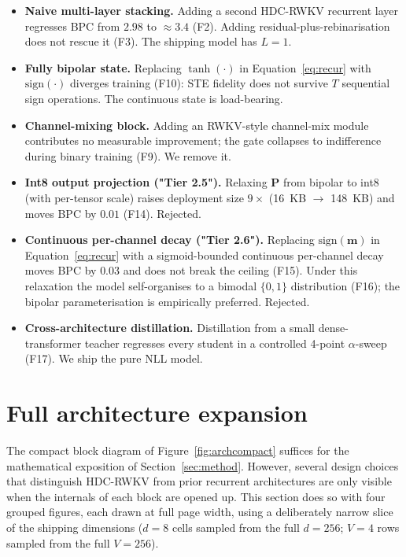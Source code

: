 \documentclass[runningheads]{llncs}
\newcommand{\bP}{\mathbf{P}}
\newcommand{\bm}{\mathbf{m}}
\begin{document}
\begin{itemize}
  \item \textbf{Naive multi-layer stacking.}
        Adding a second HDC-RWKV recurrent layer regresses BPC
        from $2.98$ to ${\approx}3.4$ (F2). Adding
        residual-plus-rebinarisation does not
        rescue it (F3). The shipping model has $L=1$.
  \item \textbf{Fully bipolar state.}
        Replacing $\tanh(\cdot)$ in Equation~\ref{eq:recur} with
        $\mathrm{sign}(\cdot)$ diverges training (F10): STE fidelity
        does not survive $T$ sequential sign operations. The
        continuous state is load-bearing.
  \item \textbf{Channel-mixing block.}
        Adding an RWKV-style channel-mix module contributes no
        measurable improvement; the gate collapses to indifference
        during binary training (F9). We remove it.
  \item \textbf{Int8 output projection ("Tier 2.5").}
        Relaxing $\bP$ from bipolar to int8 (with per-tensor scale)
        raises deployment size $9\times$ (16~KB $\to$ 148~KB) and
        moves BPC by $0.01$ (F14). Rejected.
  \item \textbf{Continuous per-channel decay ("Tier 2.6").}
        Replacing $\mathrm{sign}(\bm)$ in Equation~\ref{eq:recur} with
        a sigmoid-bounded continuous per-channel decay moves BPC by
        $0.03$ and does not break the ceiling (F15). Under this
        relaxation the model self-organises to a bimodal $\{0,1\}$
        distribution (F16); the bipolar parameterisation is
        empirically preferred. Rejected.
  \item \textbf{Cross-architecture distillation.}
        Distillation from a small dense-transformer teacher regresses
        every student in a controlled 4-point $\alpha$-sweep (F17).
        We ship the pure NLL model.
\end{itemize}


\section{Full architecture expansion}
\label{sec:archexpanded}

The compact block diagram of Figure~\ref{fig:archcompact} suffices for
the mathematical exposition of Section~\ref{sec:method}. However,
several design choices that distinguish HDC-RWKV from prior recurrent
architectures are only visible when the internals of each block are
opened up. This section does so with four grouped figures, each drawn
at full page width, using a deliberately narrow slice of the shipping
dimensions ($d{=}8$ cells sampled from the full $d{=}256$; $V{=}4$ rows
sampled from the full $V{=}256$).
\end{document}
